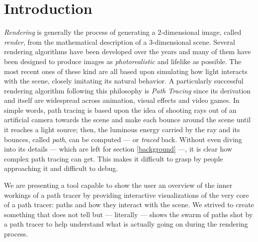 \chapter{Introduction}

\textit{Rendering} is generally the process of generating a 2-dimensional image, called \textit{render}, from the mathematical description of a 3-dimensional scene. 
Several rendering algorithms have been developed over the years and many of them have been designed to produce images as \textit{photorealistic} and lifelike as possible. The most recent ones of these kind are all based upon simulating how light interacts with the scene, closely imitating its natural behavior. A particularly successful rendering algorithm following this philosophy is \textit{Path Tracing} \cite{kajiya1986rendering} since its derivation and itself are widespread across animation, visual effects and video games. In simple words, path tracing is based upon the idea of shooting rays out of an artificial camera towards the scene and make each bounce around the scene until it reaches a light source; then, the luminous energy carried by the ray and its bounces, called \textit{path}, can be computed --- or \textit{traced} back. Without even diving into its details --- which are left for section \ref{background} ---, it is clear how complex path tracing can get. This makes it difficult to grasp by people approaching it and difficult to debug.

We are presenting a tool capable to show the user an overview of the inner workings of a path tracer by providing interactive visualizations of the very core of a path tracer: paths and how they interact with the scene.
We strived to create something that does not tell but --- literally --- shows the swarm of paths shot by a path tracer to help understand what is actually going on during the rendering process.

